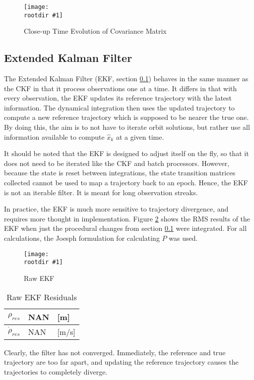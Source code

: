 \documentclass[12pt,a4paper,oneside]{article}
\numberwithin{equation}{section}   		%
\newcommand{\rootdir}{./Figures/}
\newcommand{\figH}[3]{
			\begin{figure}[H]
				\centering
				\texttt{[image: \\rootdir \#1]}
				\caption{#2}
				\label{#3}
			\end{figure}
			}
\newcommand{\fig}[3]{
			\begin{figure}
				\centering
				\texttt{[image: \\rootdir \#1]}
				\caption{#2}
				\label{#3}
			\end{figure}
			}
\begin{document}
\figH{CovCloseup.png}{Close-up Time Evolution of Covariance Matrix}{fig:Cov Evolve2}




\subsection{Extended Kalman Filter}
\label{sec:Extended Kalman Filter}
The Extended Kalman Filter (EKF, section \ref{sec:Extended Kalman Filter}) behaves in the same manner as the CKF in that it process observations one at a time. It differs in that with every observation, the EKF updates its reference trajectory with the latest information. The dynamical integration then uses the updated trajectory to compute a new reference trajectory which is supposed to be nearer the true one. By doing this, the aim is to not have to iterate orbit solutions, but rather use all information available to compute $\hat{x}_k$ at a given time. 

It should be noted that the EKF is designed to adjust itself on the fly, so that it does not need to be iterated like the CKF and batch processors. However, because the state is reset between integrations, the state transition matrices collected cannot be used to map a trajectory back to an epoch. Hence, the EKF is not an iterable filter. It is meant for long observation streaks. 

In practice, the EKF is much more sensitive to trajectory divergence, and requires more thought in implementation. Figure \ref{fig:FirstEKF} shows the RMS results of the EKF when just the procedural changes from section \ref{sec:Extended Kalman Filter} were integrated. For all calculations, the Joesph formulation for calculating $P$ was used. 

\fig{FirstEKF.eps}{Raw EKF}{fig:FirstEKF}

\begin{table}[H]
\centering
	\begin{tabular}{|l|l|l|}
		\hline
		$\rho_{res}$		&	NAN		& [m]		\\\hline
		$\dot{\rho}_{res}$	&	NAN 	& [m/s] 	\\\hline
	\end{tabular}
	\caption{Raw EKF Residuals}
	\label{tab:Raw EKF}
\end{table}

Clearly, the filter has not converged. Immediately, the reference and true trajectory are too far apart, and updating the reference trajectory causes the trajectories to completely diverge. 
\end{document}
